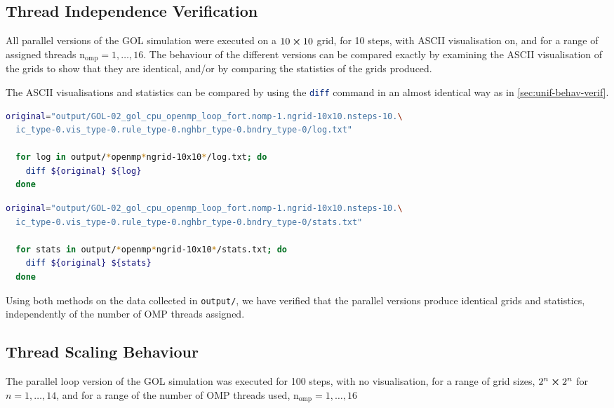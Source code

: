 \documentclass[]{article}
\begin{document}
\subsection{Thread Independence Verification}
\label{sec:thre-indep-verif}

All parallel versions of the GOL simulation were executed on a $10 \cross 10$
grid, for 10 steps, with ASCII visualisation on, and for a range of assigned
threads $\mathrm{n_{omp}} = 1, \dotsc, 16$.
The behaviour of the different versions can be compared exactly by examining the
ASCII visualisation of the grids to show that they are identical, and/or by
comparing the statistics of the grids produced.

The ASCII visualisations and statistics can be compared by using the
\lstinline[language=Bash]{diff} command in an almost identical way as in
\autoref{sec:unif-behav-verif}.

\begin{lstlisting}[language=Bash]
  original="output/GOL-02_gol_cpu_openmp_loop_fort.nomp-1.ngrid-10x10.nsteps-10.\
  ic_type-0.vis_type-0.rule_type-0.nghbr_type-0.bndry_type-0/log.txt"

  for log in output/*openmp*ngrid-10x10*/log.txt; do
    diff ${original} ${log}
  done
\end{lstlisting}

\begin{lstlisting}[language=Bash]
  original="output/GOL-02_gol_cpu_openmp_loop_fort.nomp-1.ngrid-10x10.nsteps-10.\
  ic_type-0.vis_type-0.rule_type-0.nghbr_type-0.bndry_type-0/stats.txt"

  for stats in output/*openmp*ngrid-10x10*/stats.txt; do
    diff ${original} ${stats}
  done
\end{lstlisting}

Using both methods on the data collected in \lstinline[style=ff]{output/}, we
have verified that the parallel versions produce identical grids and statistics,
independently of the number of OMP threads assigned.

\subsection{Thread Scaling Behaviour}
\label{sec:thread-scaling-behaviour}

The parallel loop version of the GOL simulation was executed for 100 steps, with
no visualisation, for a range of grid sizes, $2^{n} \cross 2^{n}$ for
$n = 1, \dotsc, 14$, and for a range of the number of OMP threads used,
$\mathrm{n_{omp}} = 1, \dotsc, 16$
\end{document}
